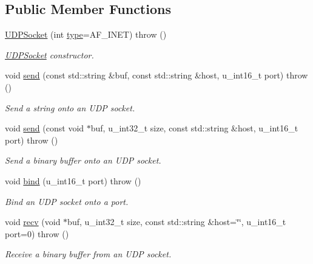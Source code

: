 \subsection*{Public Member Functions}
\begin{CompactItemize}
\item 
\hyperlink{classUDPSocket_7e2e6eb3a4c3eec5538bdfd89441802b}{UDPSocket} (int \hyperlink{classSocket_c7f6980f36023df2004271c336217cb8}{type}=AF\_\-INET)  throw ()
\begin{CompactList}\small\item\em \hyperlink{classUDPSocket}{UDPSocket} constructor. \item\end{CompactList}\item 
void \hyperlink{classUDPSocket_28db3dc93452723bdfd861442268b87c}{send} (const std::string \&buf, const std::string \&host, u\_\-int16\_\-t port)  throw ()
\begin{CompactList}\small\item\em Send a string onto an UDP socket. \item\end{CompactList}\item 
void \hyperlink{classUDPSocket_254a2df8f7205266cd684931e9914ba9}{send} (const void $\ast$buf, u\_\-int32\_\-t size, const std::string \&host, u\_\-int16\_\-t port)  throw ()
\begin{CompactList}\small\item\em Send a binary buffer onto an UDP socket. \item\end{CompactList}\item 
void \hyperlink{classUDPSocket_93ca497a5e6539eab464c4bd59a85de2}{bind} (u\_\-int16\_\-t port)  throw ()
\begin{CompactList}\small\item\em Bind an UDP socket onto a port. \item\end{CompactList}\item 
void \hyperlink{classUDPSocket_5ee2f9411fad95d5bc7ebd3eecb7d86f}{recv} (void $\ast$buf, u\_\-int32\_\-t size, const std::string \&host=\char`\"{}\char`\"{}, u\_\-int16\_\-t port=0)  throw ()
\begin{CompactList}\small\item\em Receive a binary buffer from an UDP socket. \item\end{CompactList}\item 

\end{CompactItemize}
